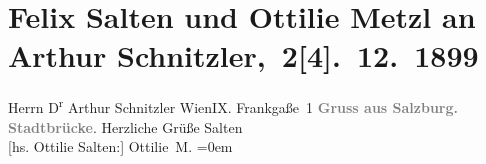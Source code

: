 

         
         \renewcommand{\erwaehntePersonen}{Personen: Felix Salten, Ottilie Salten}
         \renewcommand{\erwaehnteOrte}{Orte: Frankgasse 1, Salzburg, Staatsbrücke, Wien}
         \renewcommand{\erwaehnteWerke}{}
               \section[ Felix Salten und Ottilie Metzl an Arthur Schnitzler, 2{[}4{]}. 12. 1899]{ Felix Salten und Ottilie Metzl an Arthur
               Schnitzler, 2{[}4{]}. 12. 1899}\nopagebreak{}\rehead{ }\begin{ledgroupsized}[t]{13cm}\normalsize\beginnumbering \toendnotes[C]{\smallbreak\pagebreak[2]} 
\pstart{}{\pb}Herrn D\textsuperscript{r} Arthur Schnitzler \pend{}\pstart{}Wien\pend{}\pstart{}IX. Frankgaße 1\pend{}{\bigskip}\pstart
           \noindent{}\centering{}{\pb}\textcolor{gray}{\textbf{Gruss aus Salzburg.}}\pend
           \pstart
           \noindent{}\centering{}\textcolor{gray}{\textbf{Stadtbrücke}}.\pend
           \pstart
           Herzliche Grüße\pend
           \pstart
           \spacefill\mbox{Salten}{\\[\baselineskip]}{[}hs. Ottilie Salten:{]} \spacefill\mbox{Ottilie M.}\pend
           \leftskip=0em{}
         
         \endnumbering{}\end{ledgroupsized}  \newcommand{\dateiname}{L03303}\newcommand{\titel}{Felix Salten und Ottilie Metzl an Arthur Schnitzler, 2[4]. 12. 1899}\newcommand{\editorInnen}{Martin Anton Müller und Laura Untner}
      